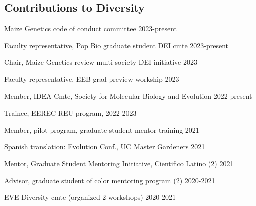 \documentclass[letterpaper,10pt]{article}
\renewenvironment{itemize}{
  \begin{list}{}{
    \setlength{\leftmargin}{1.5em}
  }
}{
  \end{list}
}
\begin{document}

\subsection*{Contributions to Diversity}
\begin{itemize}
  \setlength\itemsep{0ex}
  \item Maize Genetics code of conduct committee \hfill 2023-present %
  \item Faculty representative, Pop Bio graduate student DEI cmte \hfill 2023-present
  \item Chair, Maize Genetics review multi-society DEI initiative \hfill 2023
  \item Faculty representative, EEB grad preview workship \hfill 2023
  \item Member, IDEA Cmte, Society for Molecular Biology and Evolution \hfill2022-present
  \item Trainee, EEREC REU program, \hfill 2022-2023
  \item Member, pilot program, graduate student mentor training \hfill 2021
  \item Spanish translation: Evolution Conf., UC Master Gardeners \hfill 2021
  \item Mentor, Graduate Student Mentoring Initiative, Cientifico Latino (2) \hfill 2021 %
  \item Advisor, graduate student of color mentoring program (2) \hfill2020-2021 %
 \item EVE Diversity cmte (organized 2 workshops)  \hfill 2020-2021
\end{itemize}
\end{document}
